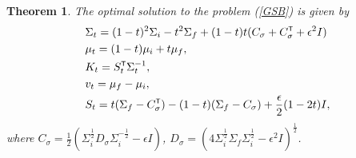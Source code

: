 \documentclass[twoside]{article}
\newtheorem{theorem}{Theorem}
\renewcommand{\eqref}[1]{(\ref{#1})}
\renewcommand{\t}{^{\mbox{\tiny\sf T}}} %
\newcommand{\tr}{\mathrm{tr}}
\begin{document}
%
%
%
\begin{theorem}
    \citep{bunne2023Schrodinger} The optimal solution to the problem \eqref{GSB} is given by 
    \begin{subequations} \label{GSB_sol}
        \begin{align}
            & \Sigma_t = (1-t)^2 \Sigma_i - t^2 \Sigma_f + (1-t) t (C_{\sigma} + C_{\sigma}\t + \epsilon ^2 I) \\
            & \mu_t = (1-t)\mu_i + t \mu_f, \\
            & K_t = S_t \t \Sigma_t^{-1}, \\
            & v_t = \mu_f - \mu_i, \\
            & S_t = t (\Sigma_f - C_{\sigma}\t) - (1-t) (\Sigma_f -  C_{\sigma}) + \frac{\epsilon}{2} (1 - 2 t) I,
        \end{align}
    \end{subequations}
    where 
    $C_{\sigma} = \frac{1}{2} ( \Sigma_i^{\frac{1}{2}} D_{\sigma} \Sigma_i^{-\frac{1}{2}} - \epsilon I)$, $D_{\sigma} =( 4 \Sigma_i^{\frac{1}{2}} \Sigma_{f} \Sigma_i^{\frac{1}{2}} - \epsilon^2 I)^{\frac{1}{2}}$. 
\end{theorem}
\end{document}
